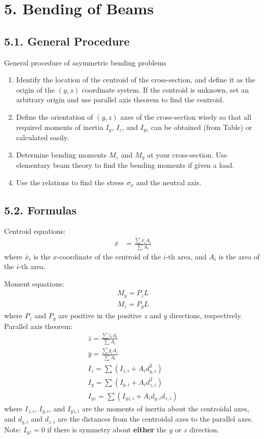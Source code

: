 \section*{5. Bending of Beams}
\subsection*{5.1. General Procedure}
General procedure of asymmetric bending problems
\begin{enumerate}
    \item Identify the location of the centroid of the cross-section, and define it as the origin of the $(y, z)$ coordinate system.
    If the centroid is unknown, set an arbitrary origin and use parallel axis theorem to find the centroid.
    \item Define the orientation of $(y, z)$ axes of the cross-section wisely so that all required moments of 
    inertia $I_y$, $I_z$, and $I_{yz}$ can be obtained (from Table) or calculated easily.
    \item Determine bending moments $M_z$ and $M_y$ at your cross-section. Use elementary beam theory to find the bending moments 
    if given a load.
    \item Use the relations to find the stress $\sigma_x$ and the neutral axis.
\end{enumerate}
\subsection*{5.2. Formulas}
Centroid equations:
\begin{align*}
    \bar{x} &= \frac{\sum \bar{x}_i A_i}{\sum A_i} 
\end{align*}
where $\bar{x}_i$ is the $x$-coordinate of the centroid of the $i$-th area, and $A_i$ is the area of the $i$-th area.

Moment equations:
\begin{gather*}
    M_y = P_z L \\
    M_z = P_y L 
\end{gather*}
where $P_z$ and $P_y$ are positive in the positive $z$ and $y$ directions, respectively.
Parallel axis theorem:
\begin{gather*}
    \bar{z} = \frac{\sum \bar{z}_i A_i}{\sum A_i} \\
    \bar{y} = \frac{\sum \bar{y}_i A_i}{\sum A_i} \\
    I_z = \sum(I_{\bar{z}, i} + A_i d_{y, i}^2) \\
    I_y = \sum(I_{\bar{y}, i} + A_i d_{z, i}^2) \\
    I_{yz} = \sum(I_{\bar{yz}, i} + A_i d_{y, i} d_{z, i}) 
\end{gather*}
where $I_{\bar{z}, i}$, $I_{\bar{y}, i}$, and $I_{\bar{yz}, i}$ are the moments of inertia about the centroidal axes, 
and $d_{y, i}$ and $d_{z, i}$ are the distances from the centroidal axes to the parallel axes. Note:
$I_{yz} = 0$ if there is symmetry about \textbf{either} the $y$ or $z$ direction.

